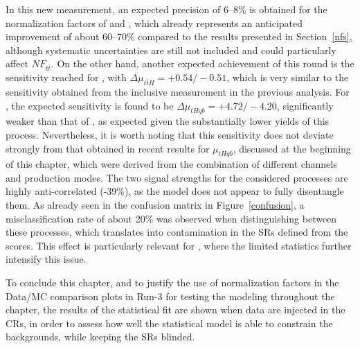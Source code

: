 In this new measurement, an expected precision of 6–8\% is obtained for the normalization factors of \ztautau and \ttbar, which already represents an anticipated improvement of about 60–70\% compared to the results presented in Section~\ref{nfs}, although systematic uncertainties are still not included and could particularly affect $NF_{t\bar{t}}$. On the other hand, another expected achievement of this round is the sensitivity reached for \ttH, with $\Delta \mu_{t\bar{t}H} = +0.54 / -0.51$, which is very similar to the sensitivity obtained from the inclusive \ttH measurement in the previous analysis. For \thqb, the expected sensitivity is found to be $\Delta \mu_{tHqb} = +4.72 / -4.20$, significantly weaker than that of \ttH, as expected given the substantially lower yields of this process. Nevertheless, it is worth noting that this sensitivity does not deviate strongly from that obtained in recent results for $\mu_{tHqb}$, discussed at the beginning of this chapter, which were derived from the combination of different channels and production modes.
The two signal strengths for the considered processes are highly anti-correlated (-39\%), as the model does not appear to fully disentangle them. As already seen in the confusion matrix in Figure~\ref{confusion}, a misclassification rate of about 20\% was observed when distinguishing between these processes, which translates into contamination in the SRs defined from the scores. This effect is particularly relevant for \thqb, where the limited statistics further intensify this issue.

To conclude this chapter, and to justify the use of normalization factors in the Data/MC comparison plots in Run-3 for testing the modeling throughout the chapter, the results of the statistical fit are shown when data are injected in the CRs, in order to assess how well the statistical model is able to constrain the backgrounds, while keeping the SRs blinded.

